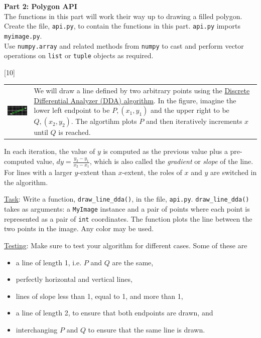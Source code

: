 \documentclass[addpoints]{exam}
\begin{document}
\begin{questions}
  \begin{EnvFullwidth}
    {\Large\bf Part 2: Polygon API}\\

    The functions in this part will work their way up to drawing a filled polygon.\\ Create the file, \texttt{api.py}, to contain the functions in this part. \texttt{api.py} imports \texttt{myimage.py}.\\Use \texttt{numpy.array} and related methods from \texttt{numpy} to cast and perform vector operations on \texttt{list} or \texttt{tuple} objects as required.
  \end{EnvFullwidth}

[10]

  \noindent
  \begin{tabularx}{\linewidth}{lX}
    \includegraphics[align=t]{dda} &
                                     We will draw a line defined by two arbitrary points using the \href{https://en.wikipedia.org/wiki/Digital_differential_analyzer_(graphics_algorithm)}{Discrete Differential Analyzer (DDA) algorithm}. In the figure, imagine the lower left endpoint to be $P, (x_1,y_1)$ and the upper right to be $Q, (x_2,y_2)$. The algortihm plots $P$ and then iteratively increments $x$ until $Q$ is reached.
  \end{tabularx}
  In each iteration, the value of $y$ is computed as the previous value plus a pre-computed value, $dy = \frac{y_2-y_1}{x_2-x_1}$, which is also called the \textit{gradient} or \textit{slope} of the line. For lines with a larger $y$-extent than $x$-extent, the roles of $x$ and $y$ are switched in the algorithm.
  
  \underline{Task}: Write a function, \texttt{draw\_line\_dda()}, in the file, \texttt{api.py}. \texttt{draw\_line\_dda()} takes as arguments: a \texttt{MyImage} instance and a pair of points where each point is represented as a pair of \texttt{int} coordinates. The function plots the line between the two points in the image. Any color may be used.

  \underline{Testing}: Make sure to test your algorithm for different cases. Some of these are
  \begin{itemize}
  \item a line of length 1, i.e. $P$ and $Q$ are the same,
  \item perfectly horizontal and vertical lines,
  \item lines of slope less than 1, equal to 1, and more than 1,
  \item a line of length 2, to ensure that both endpoints are drawn, and
  \item interchanging $P$ and $Q$ to ensure that the same line is drawn.
  \end{itemize}


\end{questions}
\end{document}
